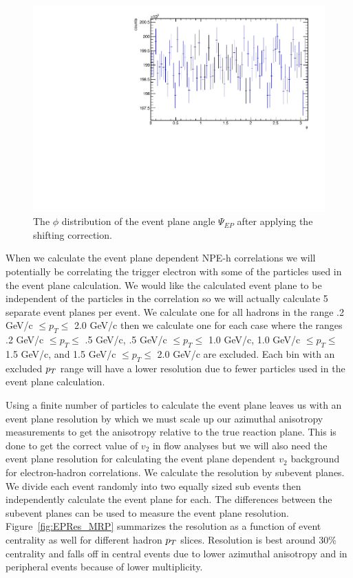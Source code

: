 \begin{figure}[htbp]
\begin{center}
\includegraphics[scale=.75]{Plots/Correlations/EPPhi_corrected.pdf}
\end{center}
\caption[Corrected Event Plane Distribution]{The $\phi$ distribution of the event plane angle $\Psi_{EP}$ after applying the shifting correction.}
\label{fig:EPPhi_corrected}
\end{figure}

When we calculate the event plane dependent NPE-h correlations we will potentially be correlating the trigger electron with some of the particles used in the event plane calculation. We would like the calculated event plane to be independent of the particles in the correlation so we will actually calculate 5 separate event planes per event. We calculate one for all hadrons in the range .2 GeV/c $\leq p_{T} \leq $ 2.0 GeV/c then we calculate one for each case where the ranges .2 GeV/c $\leq p_{T} \leq$ .5 GeV/c, .5 GeV/c $\leq p_{T} \leq$ 1.0 GeV/c, 1.0 GeV/c $\leq p_{T} \leq$ 1.5 GeV/c, and 1.5 GeV/c $\leq p_{T} \leq$ 2.0 GeV/c are excluded. Each bin with an excluded $p_{T}$ range will have a lower resolution due to fewer particles used in the event plane calculation.

Using a finite number of particles to calculate the event plane leaves us with an event plane resolution by which we must scale up our azimuthal anisotropy measurements to get the anisotropy relative to the true reaction plane. This is done to get the correct value of $v_2$ in flow analyses but we will also need the event plane resolution for calculating the event plane dependent $v_2$ background for electron-hadron correlations. We calculate the resolution by subevent planes. We divide each event randomly into two equally sized sub events then independently calculate the event plane for each. The differences between the subevent planes can be used to measure the event plane resolution. Figure~\ref{fig:EPRes_MRP} summarizes the resolution as a function of event centrality as well for different hadron $p_{T}$ slices. Resolution is best around 30\% centrality and falls off in central events due to lower azimuthal anisotropy and in peripheral events because of lower multiplicity.

